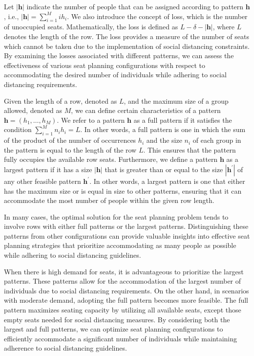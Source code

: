 Let $|\bm{h}|$ indicate the number of people that can be assigned according to pattern $\bm{h}$, i.e., $|\bm{h}| = \sum_{i =1}^{M} i h_i$. We also introduce the concept of loss, which is the number of unoccupied seats. Mathematically, the loss is defined as $L- \delta - |\bm{h}|$, where $L$ denotes the length of the row. The loss provides a measure of the number of seats which cannot be taken due to the implementation of social distancing constraints. By examining the losses associated with different patterns, we can assess the effectiveness of various seat planning configurations with respect to accommodating the desired number of individuals while adhering to social distancing requirements.

\begin{definition}
Given the length of a row, denoted as $L$, and the maximum size of a group allowed, denoted as $M$, we can define certain characteristics of a pattern $\bm{h} = (h_1, \ldots, h_M)$.
We refer to a pattern $\bm{h}$ as a full pattern if it satisfies the condition $\sum_{i=1}^{M} n_i h_i = L$. In other words, a full pattern is one in which the sum of the product of the number of occurrences $h_i$ and the size $n_i$ of each group in the pattern is equal to the length of the row $L$. This ensures that the pattern fully occupies the available row seats.
Furthermore, we define a pattern $\bm{h}$ as a largest pattern if it has a size $|\bm{h}|$ that is greater than or equal to the size $|\bm{h}^{\prime}|$ of any other feasible pattern $\bm{h}^{\prime}$. In other words, a largest pattern is one that either has the maximum size or is equal in size to other patterns, ensuring that it can accommodate the most number of people within the given row length.
\end{definition}

In many cases, the optimal solution for the seat planning problem tends to involve rows with either full patterns or the largest patterns. Distinguishing these patterns from other configurations can provide valuable insights into effective seat planning strategies that prioritize accommodating as many people as possible while adhering to social distancing guidelines.

When there is high demand for seats, it is advantageous to prioritize the largest patterns. These patterns allow for the accommodation of the largest number of individuals due to social distancing requirements. On the other hand, in scenarios with moderate demand, adopting the full pattern becomes more feasible. The full pattern maximizes seating capacity by utilizing all available seats, except those empty seats needed for social distancing measures. By considering both the largest and full patterns, we can optimize seat planning configurations to efficiently accommodate a significant number of individuals while maintaining adherence to social distancing guidelines. 
  
